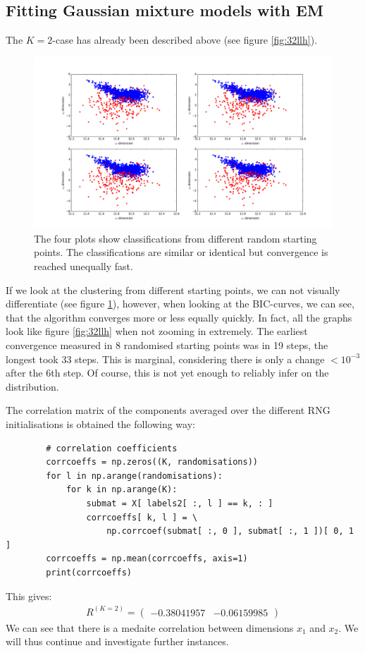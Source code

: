 \subsection{Fitting Gaussian mixture models with EM}\label{ex:3.3}
The $K=2$-case has already been described above (see figure \ref{fig:32llh}). 

\begin{figure}[H]
	\centering \includegraphics{../Figures/Ex3_3_scatters.png}
	\caption{The four plots show classifications from different random starting points. The classifications are similar or identical but convergence is reached unequally fast.}
	\label{fig:33scatter}
\end{figure}

If we look at the clustering from different starting points, we can not visually differentiate (see figure \ref{fig:33scatter}), however, when looking at the BIC-curves, we can see, that the algorithm converges more or less equally quickly. In fact, all the graphs look like figure \ref{fig:32llh} when not zooming in extremely. The earliest convergence measured in 8 randomised starting points was in 19 steps, the longest took 33 steps. This is marginal, considering there is only a change $<10^{-3}$ after the 6th step. Of course, this is not yet enough to reliably infer on the distribution. 

The correlation matrix of the components averaged over the different RNG initialisations is obtained the following way:
\begin{verbatim}
        # correlation coefficients
        corrcoeffs = np.zeros((K, randomisations))
        for l in np.arange(randomisations):
            for k in np.arange(K):
                submat = X[ labels2[ :, l ] == k, : ]
                corrcoeffs[ k, l ] = \
                    np.corrcoef(submat[ :, 0 ], submat[ :, 1 ])[ 0, 1 ]
        corrcoeffs = np.mean(corrcoeffs, axis=1)
        print(corrcoeffs)

\end{verbatim}
This gives:
\begin{align}
R^{(K=2)} = \begin{pmatrix}
-0.38041957 & -0.06159985
\end{pmatrix}
\end{align}
We can see that there is a medaite correlation between dimensions $x_1$ and $x_2$. We will thus continue and investigate further instances.

